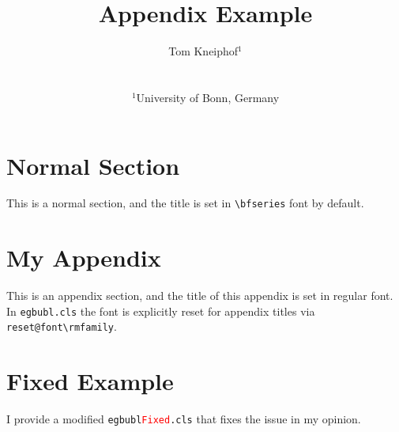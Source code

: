 

\title[Appendix Example]%
      {Appendix Example}

\author[Tom Kneiphof]
{\parbox{\textwidth}{\centering Tom Kneiphof$^{1}$
	}
        \\
{\parbox{\textwidth}{\centering $^1$University of Bonn, Germany}
}
}

%




\maketitle

\section{Normal Section}
This is a normal section, and the title is set in \verb|\bfseries| font by default.

\appendix

\section{My Appendix}
This is an appendix section, and the title of this appendix is set in regular font.
In \texttt{egbubl.cls} the font is explicitly reset for appendix titles via \verb|reset@font\rmfamily|.

\section{Fixed Example}
I provide a modified \texttt{egbubl\textcolor{red}{Fixed}.cls} that fixes the issue in my opinion.


